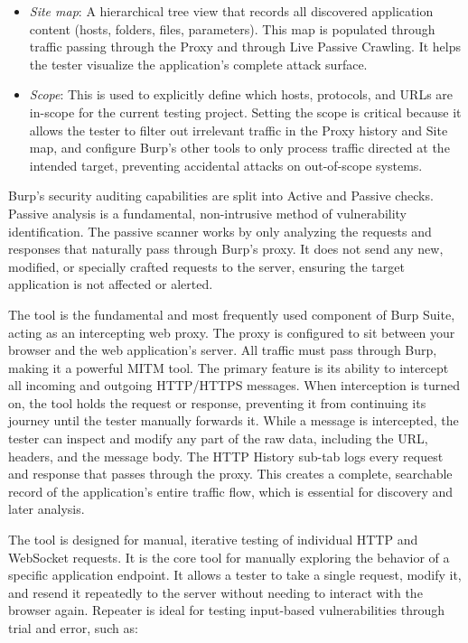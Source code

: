 \begin{itemize}
    \item \textit{Site map}: A hierarchical tree view that records all discovered application content (hosts, folders, files, parameters). This map is populated through traffic passing through the Proxy and through Live Passive Crawling. It helps the tester visualize the application's complete attack surface.
    \item \textit{Scope}: This is used to explicitly define which hosts, protocols, and URLs are in-scope for the current testing project. Setting the scope is critical because it allows the tester to filter out irrelevant traffic in the Proxy history and Site map, and configure Burp's other tools to only process traffic directed at the intended target, preventing accidental attacks on out-of-scope systems.
\end{itemize}

Burp's security auditing capabilities are split into Active and Passive checks. Passive analysis is a fundamental, non-intrusive method of vulnerability identification. The passive scanner works by only analyzing the requests and responses that naturally pass through Burp's proxy. It does not send any new, modified, or specially crafted requests to the server, ensuring the target application is not affected or alerted.

The  tool is the fundamental and most frequently used component of Burp Suite, acting as an intercepting web proxy. The proxy is configured to sit between your browser and the web application's server. All traffic must pass through Burp, making it a powerful MITM tool. The primary feature is its ability to intercept all incoming and outgoing HTTP/HTTPS messages. When interception is turned on, the tool holds the request or response, preventing it from continuing its journey until the tester manually forwards it. While a message is intercepted, the tester can inspect and modify any part of the raw data, including the URL, headers, and the message body. The HTTP History sub-tab logs every request and response that passes through the proxy. This creates a complete, searchable record of the application's entire traffic flow, which is essential for discovery and later analysis.

The  tool is designed for manual, iterative testing of individual HTTP and WebSocket requests. It is the core tool for manually exploring the behavior of a specific application endpoint. It allows a tester to take a single request, modify it, and resend it repeatedly to the server without needing to interact with the browser again. Repeater is ideal for testing input-based vulnerabilities through trial and error, such as:

